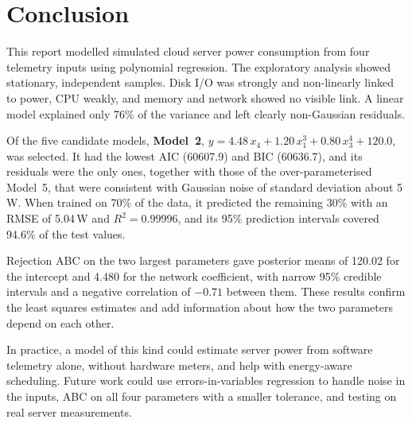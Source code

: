 \section{Conclusion}
\label{sec:conclusion}

This report modelled simulated cloud server power consumption from four telemetry inputs using polynomial regression. The exploratory analysis showed stationary, independent samples. Disk I/O was strongly and non-linearly linked to power, CPU weakly, and memory and network showed no visible link. A linear model explained only 76\% of the variance and left clearly non-Gaussian residuals.

Of the five candidate models, \textbf{Model~2}, $y=4.48\,x_4+1.20\,x_1^3+0.80\,x_3^4+120.0$, was selected. It had the lowest AIC (60607.9) and BIC (60636.7), and its residuals were the only ones, together with those of the over-parameterised Model~5, that were consistent with Gaussian noise of standard deviation about 5\,W. When trained on 70\% of the data, it predicted the remaining 30\% with an RMSE of 5.04\,W and $R^2=0.99996$, and its 95\% prediction intervals covered 94.6\% of the test values.

Rejection ABC on the two largest parameters gave posterior means of 120.02 for the intercept and 4.480 for the network coefficient, with narrow 95\% credible intervals and a negative correlation of $-0.71$ between them. These results confirm the least squares estimates and add information about how the two parameters depend on each other.

In practice, a model of this kind could estimate server power from software telemetry alone, without hardware meters, and help with energy-aware scheduling. Future work could use errors-in-variables regression to handle noise in the inputs, ABC on all four parameters with a smaller tolerance, and testing on real server measurements.
